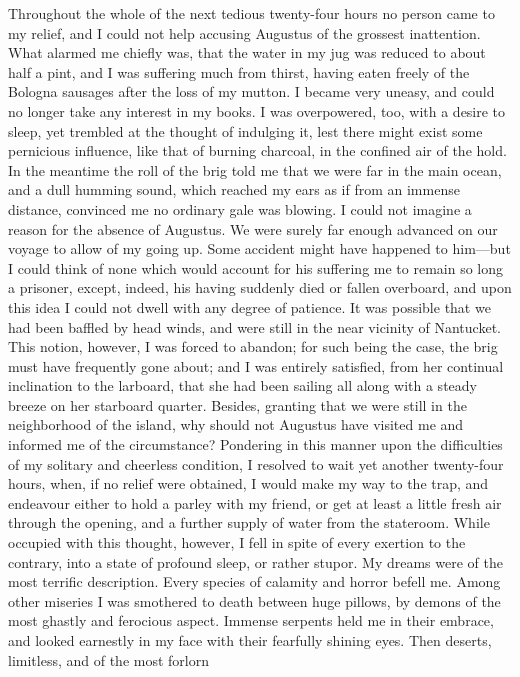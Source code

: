 Throughout the whole of the next tedious twenty-four hours no person came to
my relief, and I could not help accusing Augustus of the grossest inattention.
What alarmed me chiefly was, that the water in my jug was reduced to about half
a pint, and I was suffering much from thirst, having eaten freely of the Bologna
sausages after the loss of my mutton. I became very uneasy, and could no longer
take any interest in my books. I was overpowered, too, with a desire to sleep,
yet trembled at the thought of indulging it, lest there might exist some
pernicious influence, like that of burning charcoal, in the confined air of the
hold. In the meantime the roll of the brig told me that we were far in the main
ocean, and a dull humming sound, which reached my ears as if from an immense
distance, convinced me no ordinary gale was blowing. I could not imagine a
reason for the absence of Augustus. We were surely far enough advanced on our
voyage to allow of my going up. Some accident might have happened to him---but I
could think of none which would account for his suffering me to remain so long a
prisoner, except, indeed, his having suddenly died or fallen overboard, and upon
this idea I could not dwell with any degree of patience. It was possible that we
had been baffled by head winds, and were still in the near vicinity of
Nantucket. This notion, however, I was forced to abandon; for such being the
case, the brig must have frequently gone about; and I was entirely satisfied,
from her continual inclination to the larboard, that she had been sailing all
along with a steady breeze on her starboard quarter. Besides, granting that we
were still in the neighborhood of the island, why should not Augustus have
visited me and informed me of the circumstance? Pondering in this manner upon
the difficulties of my solitary and cheerless condition, I resolved to wait yet
another twenty-four hours, when, if no relief were obtained, I would make my way
to the trap, and endeavour either to hold a parley with my friend, or get at
least a little fresh air through the opening, and a further supply of water from
the stateroom. While occupied with this thought, however, I fell in spite of
every exertion to the contrary, into a state of profound sleep, or rather
stupor. My dreams were of the most terrific description. Every species of
calamity and horror befell me. Among other miseries I was smothered to death
between huge pillows, by demons of the most ghastly and ferocious aspect.
Immense serpents held me in their embrace, and looked earnestly in my face with
their fearfully shining eyes. Then deserts, limitless, and of the most forlorn
